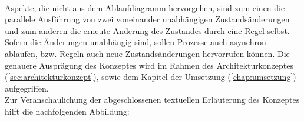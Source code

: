         \\
        Aspekte, die nicht aus dem Ablaufdiagramm hervorgehen, sind zum einen die parallele Ausführung von zwei voneinander unabhängigen 
        Zustandsänderungen und zum anderen die erneute Änderung des Zustandes durch eine Regel selbst. Sofern die Änderungen unabhängig 
        sind, sollen Prozesse auch asynchron ablaufen, bzw. Regeln auch neue Zustandsänderungen hervorrufen können. Die genauere Ausprägung des 
        Konzeptes wird im Rahmen des Architekturkonzeptes (\ref{sec:architekturkonzept}), sowie dem Kapitel der Umsetzung 
        (\ref{chap:umsetzung}) aufgegriffen. 
        \\
        \linebreak
        Zur Veranschaulichung der abgeschlossenen textuellen Erläuterung des Konzeptes hilft die nachfolgenden Abbildung: 
        